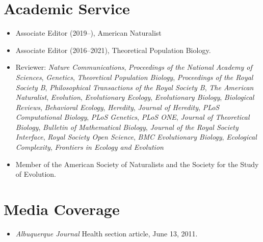 \documentclass[11pt]{article}
\begin{document}
  \section{Academic Service}
  \begin{itemize}
    \item Associate Editor (2019--), American Naturalist
    \item Associate Editor (2016--2021), Theoretical Population Biology.
    \item Reviewer: \textit{Nature Communications}, \textit{Proceedings of the National Academy of Sciences}, \textit{Genetics}, \textit{Theoretical Population Biology}, \textit{Proceedings of the Royal Society B}, \textit{Philosophical Transactions of the Royal Society B}, \textit{The American Naturalist}, \textit{Evolution}, \textit{Evolutionary Ecology}, \textit{Evolutionary Biology}, \textit{Biological Reviews}, \textit{Behavioral Ecology}, \textit{Heredity}, \textit{Journal of Heredity}, \textit{PLoS Computational Biology}, \textit{PLoS Genetics}, \textit{PLoS ONE}, \textit{Journal of Theoretical Biology}, \textit{Bulletin of Mathematical Biology}, \textit{Journal of the Royal Society Interface}, \textit{Royal Society Open Science}, \textit{BMC Evolutionary Biology}, \textit{Ecological Complexity}, \textit{Frontiers in Ecology and Evolution}
  \item Member of the American Society of Naturalists and the Society for the Study of Evolution.
  \end{itemize}
  

  \section{Media Coverage}
  \begin{itemize}
  \item \textit{Albuquerque Journal} Health section article, June 13, 2011.
  \end{itemize}


  \pagestyle{fancy}
\end{document}
